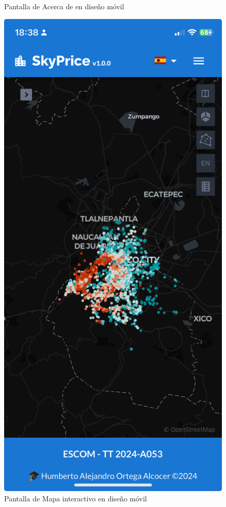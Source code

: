 \begin{figure}[H]
\begin{minipage}{0.45\textwidth}
        \caption{Pantalla de Acerca de en diseño móvil}
        \label{fig:about-responsive}
    \end{minipage}\hfill
    \begin{minipage}{0.45\textwidth}
        \centering
        \includegraphics[width=\textwidth]{imagenes/05-implementacion/interfaz-grafica/mapa-responsive.jpeg}
        \caption{Pantalla de Mapa interactivo en diseño móvil}
        \label{fig:map-responsive}
    \end{minipage}
\end{figure}

